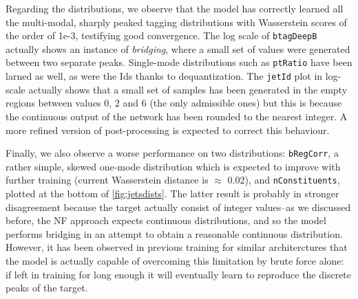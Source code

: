 Regarding the distributions, we observe that the model has correctly learned all the multi-modal, sharply peaked tagging distributions with Wasserstein scores of the order of 1e-3, testifying good convergence. The log scale of \texttt{btagDeepB} actually shows an instance of \emph{bridging}, where a small set of values were generated between two separate peaks. Single-mode distributions such as \texttt{ptRatio} have been larned as well, as were the Ids thanks to dequantization. The \texttt{jetId} plot in log-scale actually shows that a small set of samples has been generated in the empty regions between values 0, 2 and 6 (the only admissible ones) but this is because the continuous output of the network has been rounded to the nearest integer. A more refined version of post-processing is expected to correct this behaviour.

Finally, we also observe a worse performance on two distributions: \texttt{bRegCorr}, a rather simple, skewed one-mode distribution which is expected to improve with further training (current Wasserstein distance is $\approx$ 0.02), and \texttt{nConstituents}, plotted at the bottom of \ref{fig:jetsdists}. The latter result is probably in stronger disagreement because the target actually consist of integer values--as we discussed before, the NF approach expects continuous distributions, and so the model performs bridging in an attempt to obtain a reasonable continuous distribution. However, it has been observed in previous training for similar architerctures that the model is actually capable of overcoming this limitation by brute force alone: if left in training for long enough it will eventually learn to reproduce the discrete peaks of the target.

